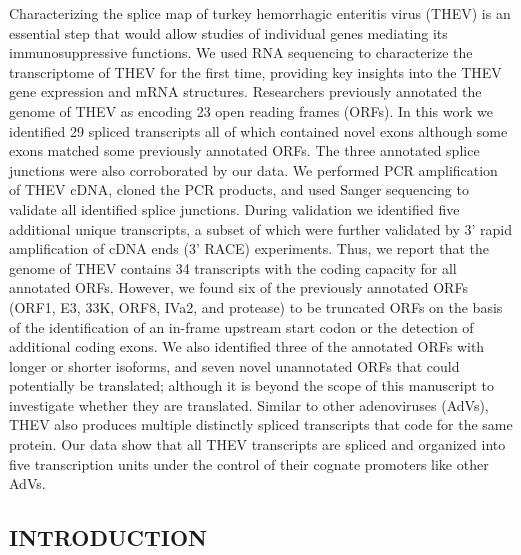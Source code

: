 \documentclass[
]{article}
\begin{document}
Characterizing the splice map of turkey hemorrhagic enteritis virus
(THEV) is an essential step that would allow studies of individual genes
mediating its immunosuppressive functions. We used RNA sequencing to
characterize the transcriptome of THEV for the first time, providing key
insights into the THEV gene expression and mRNA structures. Researchers
previously annotated the genome of THEV as encoding 23 open reading
frames (ORFs). In this work we identified 29 spliced transcripts all of
which contained novel exons although some exons matched some previously
annotated ORFs. The three annotated splice junctions were also
corroborated by our data. We performed PCR amplification of THEV cDNA,
cloned the PCR products, and used Sanger sequencing to validate all
identified splice junctions. During validation we identified five
additional unique transcripts, a subset of which were further validated
by 3' rapid amplification of cDNA ends (3' RACE) experiments. Thus, we
report that the genome of THEV contains 34 transcripts with the coding
capacity for all annotated ORFs. However, we found six of the previously
annotated ORFs (ORF1, E3, 33K, ORF8, IVa2, and protease) to be truncated
ORFs on the basis of the identification of an in-frame upstream start
codon or the detection of additional coding exons. We also identified
three of the annotated ORFs with longer or shorter isoforms, and seven
novel unannotated ORFs that could potentially be translated; although it
is beyond the scope of this manuscript to investigate whether they are
translated. Similar to other adenoviruses (AdVs), THEV also produces
multiple distinctly spliced transcripts that code for the same protein.
Our data show that all THEV transcripts are spliced and organized into
five transcription units under the control of their cognate promoters
like other AdVs. \newpage

\subsection{INTRODUCTION}\label{introduction}
\end{document}

